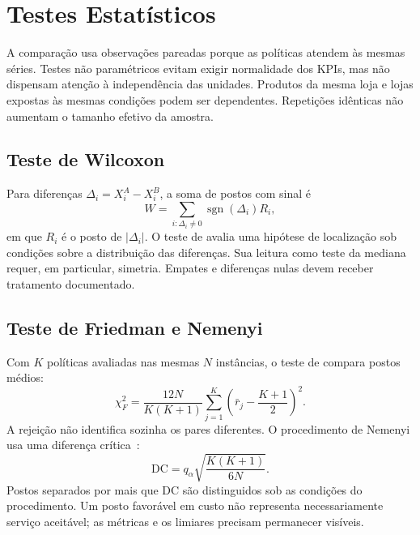 \section{Testes Estatísticos}
\label{sec:stat_tests}

A comparação usa observações pareadas porque as políticas atendem às mesmas séries. Testes não paramétricos evitam exigir normalidade dos KPIs, mas não dispensam atenção à independência das unidades. Produtos da mesma loja e lojas expostas às mesmas condições podem ser dependentes. Repetições idênticas não aumentam o tamanho efetivo da amostra.

\subsection{Teste de Wilcoxon}

Para diferenças $\Delta_i=X_i^A-X_i^B$, a soma de postos com sinal é
\begin{equation}
W=\sum_{i:\Delta_i\neq0}\operatorname{sgn}(\Delta_i)R_i,
\label{eq:wilcoxon}
\end{equation}
em que $R_i$ é o posto de $|\Delta_i|$. O teste de \citet{Wilcoxon1945SignedRank} avalia uma hipótese de localização sob condições sobre a distribuição das diferenças. Sua leitura como teste da mediana requer, em particular, simetria. Empates e diferenças nulas devem receber tratamento documentado.

\subsection{Teste de Friedman e Nemenyi}

Com $K$ políticas avaliadas nas mesmas $N$ instâncias, o teste de \citet{Friedman1940Ranks} compara postos médios:
\begin{equation}
\chi_F^2=\frac{12N}{K(K+1)}\sum_{j=1}^{K}\left(\bar r_j-\frac{K+1}{2}\right)^2.
\label{eq:friedman}
\end{equation}
A rejeição não identifica sozinha os pares diferentes. O procedimento de Nemenyi usa uma diferença crítica~\citep{Nemenyi1963PostHoc}:
\begin{equation}
\mathrm{DC}=q_\alpha\sqrt{\frac{K(K+1)}{6N}}.
\label{eq:cd}
\end{equation}
Postos separados por mais que DC são distinguidos sob as condições do procedimento. Um posto favorável em custo não representa necessariamente serviço aceitável; as métricas e os limiares precisam permanecer visíveis.

